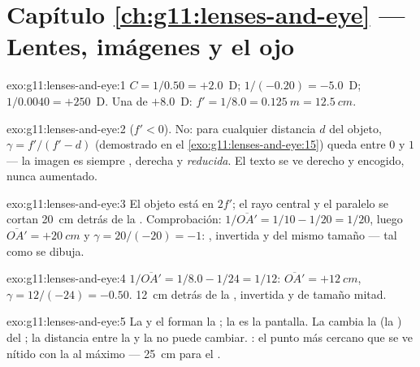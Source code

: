 \section*{Capítulo \ref{ch:g11:lenses-and-eye} --- Lentes, imágenes y el ojo}

\begin{solution}{exo:g11:lenses-and-eye:1}
$C = 1/0.50 = +2.0$~D; $1/(-0.20) = -5.0$~D; $1/0.0040 = +250$~D. Una
 de $+8.0$~D: $f' = 1/8.0 = \qty{0.125}{m} = \qty{12.5}{cm}$.
\end{solution}

\begin{solution}{exo:g11:lenses-and-eye:2}
 ($f' < 0$). No: para cualquier distancia $d$ del objeto,
$\gamma = f'/(f' - d)$ (demostrado en el
\cref{exo:g11:lenses-and-eye:15}) queda entre $0$ y $1$ --- la imagen es
siempre , derecha y \emph{reducida}. El texto se ve derecho y
encogido, nunca aumentado.
\end{solution}

\begin{solution}{exo:g11:lenses-and-eye:3}
El objeto está en $2f'$; el rayo central y el paralelo se cortan
\qty{20}{cm} detrás de la . Comprobación:
$1/\overline{OA'} = 1/10 - 1/20 = 1/20$, luego
$\overline{OA'} = +\qty{20}{cm}$ y $\gamma = 20/(-20) = -1$: ,
invertida y del mismo tamaño --- tal como se dibuja.
\end{solution}

\begin{solution}{exo:g11:lenses-and-eye:4}
$1/\overline{OA'} = 1/8.0 - 1/24 = 1/12$:
$\overline{OA'} = +\qty{12}{cm}$, $\gamma = 12/(-24) = -0.50$.  \qty{12}{cm} detrás de la , invertida y de tamaño mitad.
\end{solution}

\begin{solution}{exo:g11:lenses-and-eye:5}
La  y el  forman la ; la  es la
pantalla. La  cambia la  (la )
del ; la distancia entre la  y la  no puede
cambiar. : el punto más cercano que se ve nítido con la
 al máximo --- \qty{25}{cm} para el .
\end{solution}

